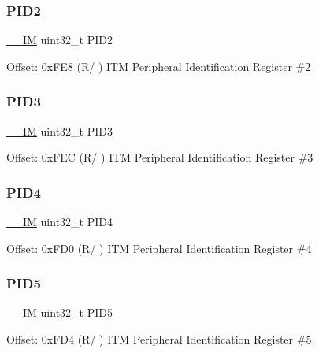 \subsubsection{\texorpdfstring{P\+I\+D2}{PID2}}
{\footnotesize\ttfamily \mbox{\hyperlink{core__cm4_8h_a4cc1649793116d7c2d8afce7a4ffce43}{\+\_\+\+\_\+\+IM}} uint32\+\_\+t P\+I\+D2}

Offset\+: 0x\+F\+E8 (R/ ) I\+TM Peripheral Identification Register \#2 \mbox{\label{struct_i_t_m___type_ac2d006eed52ba550a309e5f61ed9c401}} 
\subsubsection{\texorpdfstring{P\+I\+D3}{PID3}}
{\footnotesize\ttfamily \mbox{\hyperlink{core__cm4_8h_a4cc1649793116d7c2d8afce7a4ffce43}{\+\_\+\+\_\+\+IM}} uint32\+\_\+t P\+I\+D3}

Offset\+: 0x\+F\+EC (R/ ) I\+TM Peripheral Identification Register \#3 \mbox{\label{struct_i_t_m___type_a4c002e97cda2375d7421ad6415b6a02f}} 
\subsubsection{\texorpdfstring{P\+I\+D4}{PID4}}
{\footnotesize\ttfamily \mbox{\hyperlink{core__cm4_8h_a4cc1649793116d7c2d8afce7a4ffce43}{\+\_\+\+\_\+\+IM}} uint32\+\_\+t P\+I\+D4}

Offset\+: 0x\+F\+D0 (R/ ) I\+TM Peripheral Identification Register \#4 \mbox{\label{struct_i_t_m___type_ac085b26f43fefeef9a4cf5c2af5e4a38}} 
\subsubsection{\texorpdfstring{P\+I\+D5}{PID5}}
{\footnotesize\ttfamily \mbox{\hyperlink{core__cm4_8h_a4cc1649793116d7c2d8afce7a4ffce43}{\+\_\+\+\_\+\+IM}} uint32\+\_\+t P\+I\+D5}

Offset\+: 0x\+F\+D4 (R/ ) I\+TM Peripheral Identification Register \#5 \mbox{\label{struct_i_t_m___type_a83ac5d00dee24cc7f805b5c147625593}} 
